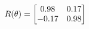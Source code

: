 \documentclass[preview]{standalone}
\begin{document}
\begin{align*}
\special{dvisvgm:raw <g id='unique000'>}R(\theta) = \begin{bmatrix}0.98 & 0.17\\-0.17 & 0.98\end{bmatrix}\special{dvisvgm:raw </g>}
\end{align*}
\end{document}
